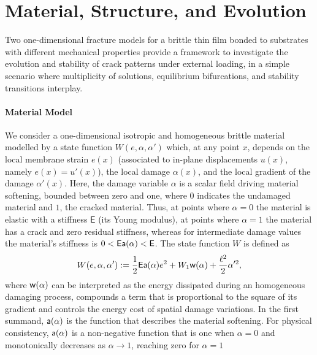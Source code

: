 \section{Material, Structure, and Evolution}

Two one-dimensional fracture models for a brittle thin film bonded to substrates with different mechanical properties provide a framework to investigate the evolution and stability of crack patterns under external loading, in a  simple scenario where multiplicity of solutions, equilibrium bifurcations, and stability transitions interplay.


\paragraph{Material Model}
We consider a one-dimensional isotropic and homogeneous brittle material modelled by a state function $W(e, \alpha, \alpha')$ which, at any point $x$,
depends on the local membrane strain $e(x)$ (associated to in-plane displacements $u(x)$, namely $e(x) = u'(x)$), the local damage $\alpha(x)$, and the local gradient of the damage $\alpha'(x)$. 
Here, the damage variable $\alpha$ is a scalar field driving material softening, bounded between zero and one, where $0$ indicates the undamaged material and $1$, the cracked material. Thus, at points where $\alpha=0$ the material is elastic with a stiffness $\mathsf{E}$ (its Young modulus), at points where $\alpha=1$ the material has a crack and zero residual stiffness, whereas for intermediate damage values the material's stiffness is $0<\mathsf{E}\mathsf{a}(\alpha)< \mathsf{E}$.  
The state function $W$ is defined as 
\begin{equation}
    \label{def:energy_material}
    W(e, \alpha, \alpha'):= \frac{1}{2} \mathsf{E} \mathsf{a}(\alpha)e^2 + W_1\mathsf{w}(\alpha) + \frac{\ell^2}{2}\alpha'^2,
\end{equation}
where $\mathsf{w}(\alpha)$ can be interpreted as the energy dissipated during an homogeneous damaging process, compounds a term that is proportional to the square of its gradient and controls the energy cost of spatial damage variations. In the first summand, $\mathsf{a}(\alpha)$ is the function that describes the material softening. %
For physical consistency, $\mathsf{a}(\alpha)$ is a non-negative function that is one when $\alpha=0$ and monotonically decreases as $\alpha\to 1$, reaching zero for $\alpha=1$  
